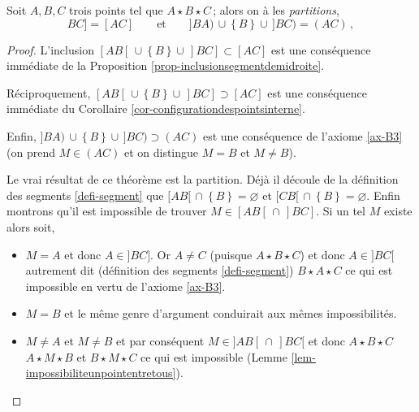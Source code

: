 \begin{thm}\label{th-partitionsemgmendroite}
    Soit $A,B,C$ trois points tel que $A\star B \star C$\,; alors on à les \emph{partitions},
    \begin{equation*}
        [AB[\,\cup \left\{B\right\}\cup\, ]BC] = [AC] \qquad \text{et} \qquad ]BA)\,\cup \left\{B\right\}\cup\, ]BC) = (AC) \,,
    \end{equation*}
    \begin{proof}
        L'inclusion $[AB[\,\cup \left\{B\right\}\cup\, ]BC] \subset [AC]$  est une conséquence immédiate de la Proposition \ref{prop-inclusionsegmentdemidroite}.

        Réciproquement, $[AB[\,\cup \left\{B\right\}\cup\, ]BC] \supset [AC]$ est une conséquence immédiate du Corollaire \ref{cor-configurationdespointsinterne}. 

        Enfin, $]BA)\,\cup \left\{B\right\}\cup\, ]BC) \supset (AC) $ est une conséquence de l'axiome \ref{ax-B3} (on prend $M\in (AC)$ et on distingue $M=B$ et $M\neq B$).

        Le vrai résultat de ce théorème est la partition. Déjà il découle de la définition des segments \ref{defi-segment}  que $[AB[\,\cap \left\{B\right\}=\varnothing$ et $[CB[\,\cap \left\{B\right\}=\varnothing$. Enfin montrons qu'il est impossible de trouver $M \in [AB[\,\cap\, ]BC]$. Si un tel $M$ existe alors soit,
        \begin{itemize}[$\bullet$]
            \item $M=A$ et donc $A\in]BC]$. Or $A\neq C$ (puisque $A\star B \star C$) et donc $A\in ]BC[$ autrement dit (définition des segments \ref{defi-segment}) $B\star A \star C$ ce qui est impossible en vertu de l'axiome \ref{ax-B3}.
            \item $M=B$ et le même genre d'argument conduirait aux mêmes impossibilités.
            \item $M\neq A$ et $M\neq B$ et par conséquent $M\in ]AB[\,\cap\, ]BC[$ et donc $A \star B\star C$ $A \star M \star B$ et $B \star M \star C$ ce qui est impossible (Lemme \ref{lem-impossibiliteunpointentretous}).
        \end{itemize}


\end{proof}
\end{thm}
